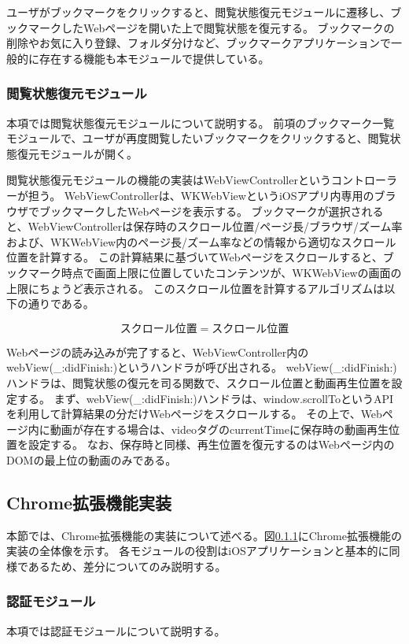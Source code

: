 ユーザがブックマークをクリックすると、閲覧状態復元モジュールに遷移し、ブックマークしたWebページを開いた上で閲覧状態を復元する。
ブックマークの削除やお気に入り登録、フォルダ分けなど、ブックマークアプリケーションで一般的に存在する機能も本モジュールで提供している。

\subsubsection{閲覧状態復元モジュール}
本項では閲覧状態復元モジュールについて説明する。
前項のブックマーク一覧モジュールで、ユーザが再度閲覧したいブックマークをクリックすると、閲覧状態復元モジュールが開く。

閲覧状態復元モジュールの機能の実装はWebViewControllerというコントローラーが担う。
WebViewControllerは、WKWebViewというiOSアプリ内専用のブラウザでブックマークしたWebページを表示する。
ブックマークが選択されると、WebViewControllerは保存時のスクロール位置/ページ長/ブラウザ/ズーム率および、WKWebView内のページ長/ズーム率などの情報から適切なスクロール位置を計算する。
この計算結果に基づいてWebページをスクロールすると、ブックマーク時点で画面上限に位置していたコンテンツが、WKWebViewの画面の上限にちょうど表示される。
このスクロール位置を計算するアルゴリズムは以下の通りである。

\begin{equation}
スクロール位置 = スクロール位置
\end{equation}

Webページの読み込みが完了すると、WebViewController内のwebView(\_:didFinish:)\cite{didFinish}というハンドラが呼び出される。
webView(\_:didFinish:)ハンドラは、閲覧状態の復元を司る関数で、スクロール位置と動画再生位置を設定する。
まず、webView(\_:didFinish:)ハンドラは、window.scrollToというAPIを利用して計算結果の分だけWebページをスクロールする。
その上で、Webページ内に動画が存在する場合は、videoタグのcurrentTimeに保存時の動画再生位置を設定する。
なお、保存時と同様、再生位置を復元するのはWebページ内のDOMの最上位の動画のみである。


\subsection{Chrome拡張機能実装}
本節では、Chrome拡張機能の実装について述べる。図\ref{}にChrome拡張機能の実装の全体像を示す。
各モジュールの役割はiOSアプリケーションと基本的に同様であるため、差分についてのみ説明する。

\subsubsection{認証モジュール}
本項では認証モジュールについて説明する。

